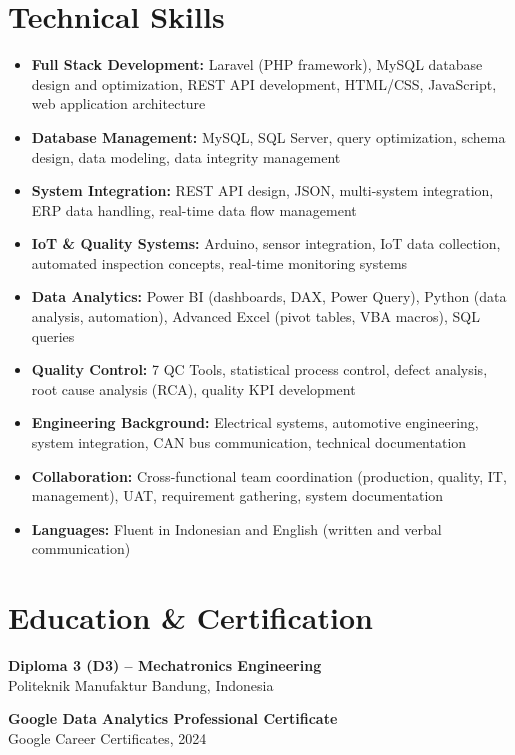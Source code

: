 \documentclass[a4paper,10pt]{article}
\begin{document}
\section*{Technical Skills}
\begin{itemize}
    \item \textbf{Full Stack Development:} Laravel (PHP framework), MySQL database design and optimization, REST API development, HTML/CSS, JavaScript, web application architecture
    \item \textbf{Database Management:} MySQL, SQL Server, query optimization, schema design, data modeling, data integrity management
    \item \textbf{System Integration:} REST API design, JSON, multi-system integration, ERP data handling, real-time data flow management
    \item \textbf{IoT \& Quality Systems:} Arduino, sensor integration, IoT data collection, automated inspection concepts, real-time monitoring systems
    \item \textbf{Data Analytics:} Power BI (dashboards, DAX, Power Query), Python (data analysis, automation), Advanced Excel (pivot tables, VBA macros), SQL queries
    \item \textbf{Quality Control:} 7 QC Tools, statistical process control, defect analysis, root cause analysis (RCA), quality KPI development
    \item \textbf{Engineering Background:} Electrical systems, automotive engineering, system integration, CAN bus communication, technical documentation
    \item \textbf{Collaboration:} Cross-functional team coordination (production, quality, IT, management), UAT, requirement gathering, system documentation
    \item \textbf{Languages:} Fluent in Indonesian and English (written and verbal communication)
\end{itemize}

\section*{Education \& Certification}
\textbf{Diploma 3 (D3) – Mechatronics Engineering}\\
Politeknik Manufaktur Bandung, Indonesia

\vspace{4pt}

\textbf{Google Data Analytics Professional Certificate}\\
Google Career Certificates, 2024
\end{document}
